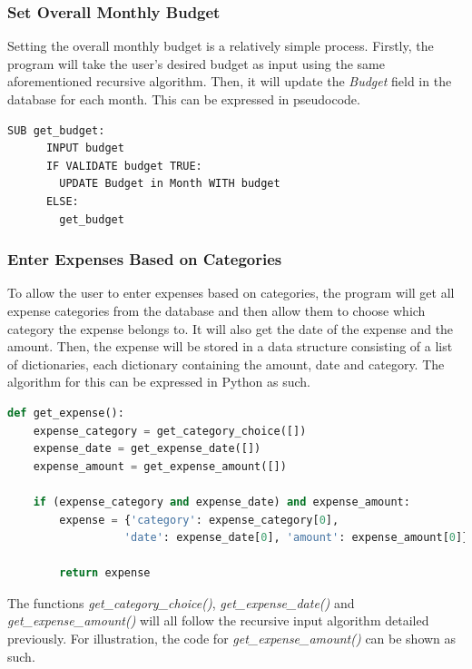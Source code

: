 \documentclass[11pt]{article}
\begin{document}
  \subsubsection{Set Overall Monthly Budget}
  Setting the overall monthly budget is a relatively simple process. Firstly, the program will take the user's desired budget as input using the same aforementioned recursive algorithm. Then, it will update the \textit{Budget} field in the database for each month.
  This can be expressed in pseudocode.
  \begin{lstlisting}[caption=An algorithm to set the overall monthly budget., captionpos=b]
    SUB get_budget:
      INPUT budget
      IF VALIDATE budget TRUE:
        UPDATE Budget in Month WITH budget
      ELSE:
        get_budget
  \end{lstlisting}

  \subsubsection{Enter Expenses Based on Categories}
  To allow the user to enter expenses based on categories, the program will get all expense categories from the database and then allow them to choose which category the expense belongs to. It will also get the date of the expense and the amount. Then, the expense will be stored in a data structure consisting of a list of dictionaries, each dictionary containing the amount, date and category.
  The algorithm for this can be expressed in Python as such.
  \begin{lstlisting}[language=Python, caption=An algorithm to collect expenses from the user., captionpos=b]
  def get_expense():
    expense_category = get_category_choice([])
    expense_date = get_expense_date([])
    expense_amount = get_expense_amount([])

    if (expense_category and expense_date) and expense_amount:
        expense = {'category': expense_category[0],
                  'date': expense_date[0], 'amount': expense_amount[0]}

        return expense
  \end{lstlisting}

  The functions \textit{get\_category\_choice()}, \textit{get\_expense\_date()} and \textit{get\_expense\_amount()} will all follow the recursive input algorithm detailed previously. For illustration, the code for \textit{get\_expense\_amount()} can be shown as such.
\end{document}
